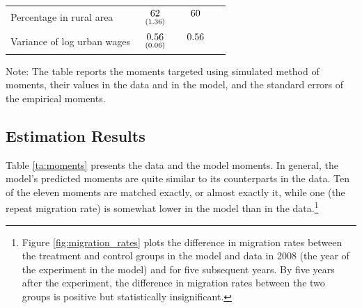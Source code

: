 \documentclass[12pt,pdftex]{article}
\begin{document}
\begin{table}[t]
\begin{center}
\begin{tabular}{l l c c}
Percentage in rural area &
$\begin{array}{c}62\vspace{-.15cm}\\ \scriptstyle (1.36)\end{array}$ &
$\begin{array}{c}60\vspace{-.15cm}\\ \scriptstyle \phantom{(0.18)}\end{array}$ & \\

Variance of log urban wages  &
$\begin{array}{c}0.56\vspace{-.15cm}\\ \scriptstyle (0.06)\end{array}$ &
$\begin{array}{c}0.56\vspace{-.15cm}\\ \scriptstyle \phantom{(0.18)}\end{array}$ & \\
\hline
\end{tabular}
\parbox[c]{5.75in}{\vspace{.1cm}
{\footnotesize Note: The table reports the moments targeted using simulated method of moments, their values in the data and in the model, and the standard errors of the empirical moments.}
}
\end{center}
\end{table}

\subsection{Estimation Results}

Table \ref{ta:moments} presents the data and the model moments. In general, the model's predicted moments are quite similar to its counterparts in the data. Ten of the eleven moments are matched exactly, or almost exactly it, while one (the repeat migration rate) is somewhat lower in the model than in the data.\footnote{Figure \ref{fig:migration_rates} plots the difference in migration rates between the treatment and control groups in the model and data in 2008 (the year of the experiment in the model) and for five subsequent years. By five years after the experiment, the difference in migration rates between the two groups is positive but statistically insignificant.}
\end{document}
